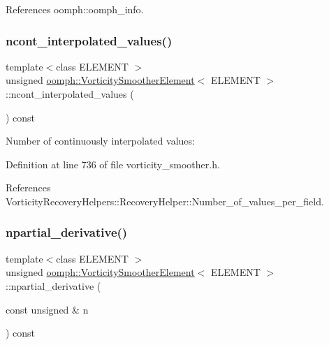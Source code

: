 References oomph\+::oomph\+\_\+info.

\mbox{\label{classoomph_1_1VorticitySmootherElement_a15559517f708dbdfe51e2e94f5bca3dc}} 
\subsubsection{\texorpdfstring{ncont\+\_\+interpolated\+\_\+values()}{ncont\_interpolated\_values()}}
{\footnotesize\ttfamily template$<$class E\+L\+E\+M\+E\+NT $>$ \\
unsigned \hyperlink{classoomph_1_1VorticitySmootherElement}{oomph\+::\+Vorticity\+Smoother\+Element}$<$ E\+L\+E\+M\+E\+NT $>$\+::ncont\+\_\+interpolated\+\_\+values (\begin{DoxyParamCaption}{ }\end{DoxyParamCaption}) const\hspace{0.3cm}{\ttfamily [inline]}}



Number of continuously interpolated values\+: 



Definition at line 736 of file vorticity\+\_\+smoother.\+h.



References Vorticity\+Recovery\+Helpers\+::\+Recovery\+Helper\+::\+Number\+\_\+of\+\_\+values\+\_\+per\+\_\+field.

\mbox{\label{classoomph_1_1VorticitySmootherElement_a24820e11328d5c4a87eb6fc8399e2a54}} 
\subsubsection{\texorpdfstring{npartial\+\_\+derivative()}{npartial\_derivative()}}
{\footnotesize\ttfamily template$<$class E\+L\+E\+M\+E\+NT $>$ \\
unsigned \hyperlink{classoomph_1_1VorticitySmootherElement}{oomph\+::\+Vorticity\+Smoother\+Element}$<$ E\+L\+E\+M\+E\+NT $>$\+::npartial\+\_\+derivative (\begin{DoxyParamCaption}\item[{const unsigned \&}]{n }\end{DoxyParamCaption}) const\hspace{0.3cm}{\ttfamily [inline]}}



